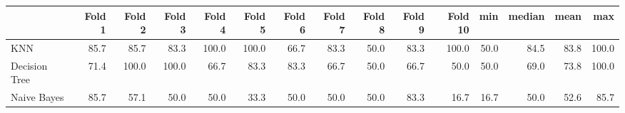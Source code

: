 \begin{tabular}{lrrrrrrrrrrrrrr}
\toprule
{} & Fold 1 & Fold 2 & Fold 3 & Fold 4 & Fold 5 & Fold 6 & Fold 7 & Fold 8 & Fold 9 & Fold 10 &   min & median &  mean &    max \\
\midrule
KNN           & 85.7 & 85.7 & 83.3 & 100.0 & 100.0 & 66.7 & 83.3 & 50.0 & 83.3 & 100.0 & 50.0 & 84.5 & 83.8 & 100.0 \\
Decision Tree & 71.4 & 100.0 & 100.0 & 66.7 & 83.3 & 83.3 & 66.7 & 50.0 & 66.7 & 50.0 & 50.0 & 69.0 & 73.8 & 100.0 \\
Naive Bayes   & 85.7 & 57.1 & 50.0 & 50.0 & 33.3 & 50.0 & 50.0 & 50.0 & 83.3 & 16.7 & 16.7 & 50.0 & 52.6 & 85.7 \\
\bottomrule
\end{tabular}

